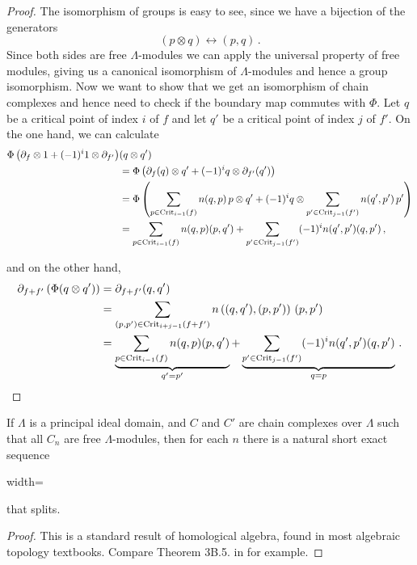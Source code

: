 	\begin{proof}
		The isomorphism of groups is easy to see, since we have a bijection of the generators
		\begin{equation*}
			(p\otimes q) \leftrightarrow (p,q)\,.
		\end{equation*} Since both sides are free $\Lambda$-modules we can apply the universal property of free modules, giving us a canonical isomorphism of $\Lambda$-modules and hence a group isomorphism.
		Now we want to show that we get an isomorphism of chain complexes and hence need to check if the boundary map commutes with $\Phi$. Let $q$ be a critical point of index $i$ of $f$ and let $q'$ be a critical point of index $j$ of $f'$. On the one hand, we can calculate
		\begin{align*}
    \Phi \left(\partial_f\otimes 1 +(-1)^i1\otimes  \partial_{f'}\right) &(q\otimes q')\\
    &= \Phi \left(\partial_f(q) \otimes q' +(-1)^i q\otimes  \partial_{f'}(q')\right)\\
    &= \Phi \left(\sum_{p\in \mathrm{Crit}_{i-1}(f)} n(q,p)\,p\otimes q' +(-1)^i q\otimes \sum_{p'\in \mathrm{Crit}_{j-1}(f')} n(q',p')\,p'\right) \\
    &=\sum_{p\in \mathrm{Crit}_{i-1}(f)} n(q,p)(p, q') +\sum_{p'\in \mathrm{Crit}_{j-1}(f')}(-1)^i n(q',p')(q,p')\,,
\end{align*} 

and on the other hand,
		\begin{align*}
    \partial_{f+f'}\left(\Phi(q \otimes q')\right)
    &=\partial_{f+f'}(q,q')\\
    &=\sum_{(p,p')\in \mathrm{Crit}_{i+j-1}(f+f')}n\left((q,q'),(p,p')\right)\,(p,p')\\
    &=\underbrace{\sum_{p\in \mathrm{Crit}_{i-1}(f)} n(q,p)(p,q')}_{q'=p'}+
    \underbrace{\sum_{p'\in \mathrm{Crit}_{j-1}(f')}(-1)^in(q',p')(q,p')}_{q=p}\,.
\end{align*}
	\end{proof}


\begin{lemma}\label{lem:morse-AlgKünForm}
	If $\Lambda$ is a principal ideal domain, and $C$ and $C'$ are chain complexes over $\Lambda$ such that all $C_n$ are free $\Lambda$-modules, then for each $n$ there is a natural short exact sequence 
	\begin{center}
		\begin{adjustbox}{width=\textwidth}
		\end{adjustbox}
	\end{center}that splits.
\end{lemma}
\begin{proof}
	This is a standard result of homological algebra, found in most algebraic topology textbooks. Compare Theorem 3B.5. in  \cite{hatcher2002algebraic} for example.
\end{proof}


